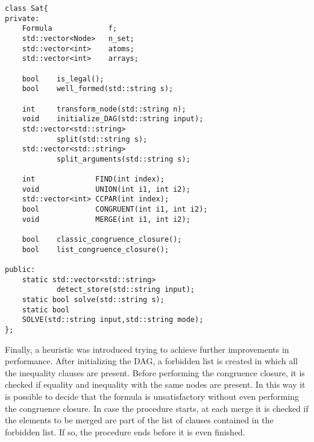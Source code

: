 \documentclass{IEEEtran}
\begin{document}
\begin{lstlisting}[style=cpp]
class Sat{
private:
	Formula 			f;
	std::vector<Node> 	n_set;
	std::vector<int> 	atoms;
	std::vector<int> 	arrays;

	bool	is_legal();
	bool 	well_formed(std::string s);
	
	int 	transform_node(std::string n);
	void 	initialize_DAG(std::string input);
	std::vector<std::string> 
			split(std::string s);
	std::vector<std::string> 
			split_arguments(std::string s);

	int 			 FIND(int index);
	void 			 UNION(int i1, int i2);
	std::vector<int> CCPAR(int index);
	bool 			 CONGRUENT(int i1, int i2);
	void 			 MERGE(int i1, int i2);

	bool 	classic_congruence_closure();
	bool 	list_congruence_closure();
	
public:
	static std::vector<std::string> 
			detect_store(std::string input);
	static bool solve(std::string s);
	static bool 
	SOLVE(std::string input,std::string mode);
};
\end{lstlisting}
Finally, a heuristic was introduced trying to achieve further improvements in performance. After initializing the DAG, a forbidden list is created in which all the inequality clauses are present. Before performing the congruence closure, it is checked if equality and inequality with the same nodes are present. In this way it is possible to decide that the formula is unsatisfactory without even performing the congruence closure. In case the procedure starts, at each merge it is checked if the elements to be merged are part of the list of clauses contained in the forbidden list. If so, the procedure ends before it is even finished.
\end{document}
